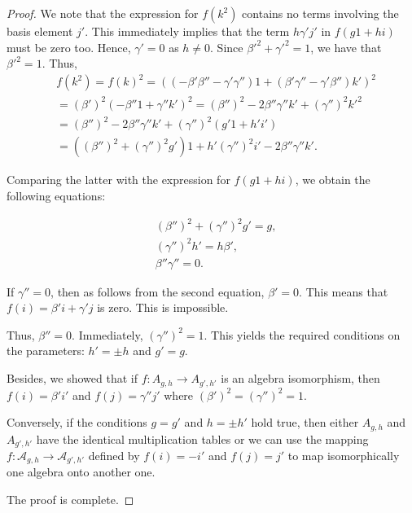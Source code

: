 \documentclass[10pt,a4paper]{amsart}
\begin{document}
\begin{proof}
We note that the expression for $f(k^2)$ contains no terms involving the basis element $j'$. This immediately implies that  the term $h \gamma' j'$ in $f(g1+hi)$ must be zero too. Hence, $\gamma'=0$ as $h\neq 0$. Since 
$\beta'^2 +\gamma'^2 = 1$, we have that $\beta'^2=1$. 
Thus, 
\begin{align*}
&f(k^2)= f(k)^2 =  ( (-\beta' \beta'' - \gamma'\gamma'') 1 + (\beta' \gamma'' - \gamma' \beta'') k' )^2\\
&= (\beta')^2 (-\beta'' 1 + \gamma'' k')^2 = (\beta'')^2 - 2 \beta''\gamma'' k' + (\gamma'' )^2 k'^2\\
&=  (\beta'')^2 - 2 \beta''\gamma'' k' + (\gamma'' )^2 (g' 1 + h' i')\\
& = ( ( \beta'')^2 + (\gamma'')^2 g')1 + h' (\gamma'')^2 i'  - 2 \beta''\gamma'' k'.
\end{align*}

Comparing the latter with the expression for  $f(g1+hi)$, we obtain the following equations:

\begin{align*}
 & (\beta'')^2 + (\gamma'')^2 g' = g, \tag{1}\\
 & (\gamma'')^2 h' = h\beta', \tag{2} \\
& \beta'' \gamma'' = 0. \tag{3}
\end{align*}

If $\gamma''=0$, then as follows from the second equation, $\beta'=0$. This means that $f(i) = \beta' i + \gamma' j$ is zero. This is impossible.

Thus, $\beta''=0$. Immediately, $(\gamma'')^2 = 1$.  This yields the required conditions on the parameters: $h' = \pm h$ and $g' =g$. 

Besides, we showed that if $f: A_{g, h}\to A_{g', h'}$ is an algebra isomorphism, then $f(i) = \beta' i'$ and $f(j)= \gamma'' j'$ where $(\beta')^2 = (\gamma'')^2 = 1.$


Conversely, if  the conditions  $g=g'$ and $h=\pm h'$ hold true, then either $A_{g, h}$ and $A_{g', h'}$ have the identical multiplication tables or we can use the mapping $f:\mathcal A_{g, h}\to \mathcal A_{g', h'}$
defined by $f(i)=-i'$ and $f(j)=j'$ to map isomorphically one algebra onto another one.

The proof is complete.

\end{proof}
\end{document}
